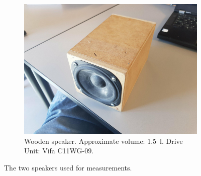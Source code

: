 \begin{figure}
\begin{subfigure}{.5\textwidth}
		\includegraphics[width=.9\linewidth, clip, trim={17cm 3cm 14cm 0}]{gfx/Speaker_wood.jpg}
		\caption{Wooden speaker. Approximate volume: \SI{1.5}{\litre}. Drive Unit: Vifa C11WG-09.}
		\label{fig:measspeak2}
	\end{subfigure}
	\caption{The two speakers used for measurements.}
	\label{fig:measspeak}
\end{figure}

%
%

